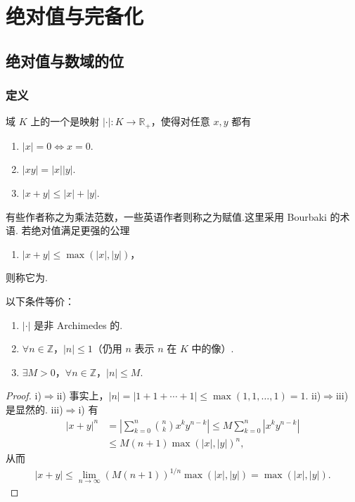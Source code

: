 \chapter{绝对值与完备化}\label{chap:nt-4}
\section{绝对值与数域的位}\label{sec:nt-4-1}
\subsection{定义}\label{sec:nt-4-1-1}
域 $K$ 上的一个是映射 $|\cdot|\colon K\longrightarrow\mathbb R_+$，使得对任意 $x,y$ 都有
\begin{enumerate}[label=\roman*)]
\item $|x|=0\Longleftrightarrow x=0$.
\item $|xy|=|x||y|$.
\item $|x+y|\le |x|+|y|$.
\end{enumerate}
有些作者称之为乘法范数，一些英语作者则称之为赋值.这里采用 Bourbaki 的术语.
若绝对值满足更强的公理
\begin{enumerate}[label=\roman*)\textquotesingle,start=3]
\item $|x+y|\le\max(|x|,|y|)$，
\end{enumerate}
则称它为.
\begin{lemma*}
以下条件等价：
\begin{enumerate}[label=\roman*)]
\item $|\cdot|$ 是非 Archimedes 的.
\item $\forall n\in\mathbb Z$，$|n|\le1$（仍用 $n$ 表示 $n$ 在 $K$ 中的像）.
\item $\exists M>0$，$\forall n\in\mathbb Z$，$|n|\le M$.
\end{enumerate}
\end{lemma*}
\begin{proof}
\textup{i)$\Rightarrow$ii)} 事实上，$|n|=|1+1+\cdots+1|\le\max(1,1,\ldots,1)=1$.
\textup{ii)$\Rightarrow$iii)} 是显然的.
\textup{iii)$\Rightarrow$i)} 有
\begin{align*}
|x+y|^n
&=\left|\sum_{k=0}^n\binom nk x^ky^{n-k}\right|
\le M\sum_{k=0}^n|x^ky^{n-k}|\\
&\le M(n+1)\max(|x|,|y|)^n,
\end{align*}
从而
\begin{align*}
|x+y|\le\lim_{n\to\infty}(M(n+1))^{1/n}\max(|x|,|y|)=\max(|x|,|y|).
\end{align*}
\end{proof}
